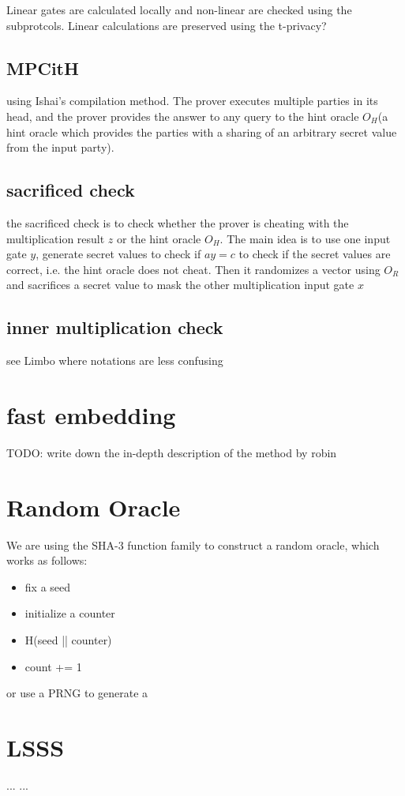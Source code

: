 \documentclass{article}
\begin{document}
Linear gates are calculated locally and non-linear are checked using the subprotcols. Linear calculations are preserved using the t-privacy?

\subsection{MPCitH}
using Ishai's compilation method. The prover executes multiple parties in its head, and the prover provides the answer to any query to the hint oracle $O_H$(a hint oracle which provides the parties with a sharing of an arbitrary secret value from the input party).

\subsection{sacrificed check}
the sacrificed check is to check whether the prover is cheating with the multiplication result $z$ or the hint oracle $O_H$. The main idea is to use one input gate $y$, generate secret values to check if $a y = c$ to check if the secret values are correct, i.e. the hint oracle does not cheat. Then it randomizes a vector using $O_R$ and sacrifices a secret value to mask the other multiplication input gate $x$

\subsection{inner multiplication check}

see Limbo where notations are less confusing

\section{fast embedding}

TODO: write down the in-depth description of the method by robin
\section{Random Oracle}
We are using the SHA-3 function family to construct a random oracle, which works as follows:

\begin{itemize}
\item fix a seed
\item initialize a counter
\item H(seed || counter)
\item count += 1
\end{itemize}

or use a PRNG to generate a 

\section{LSSS}




\begin{thebibliography}{99}
 ...
 ...
\end{thebibliography}
\end{document}
